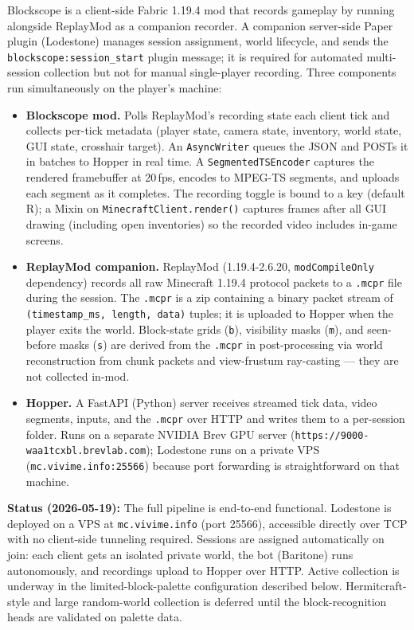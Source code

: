 \documentclass[11pt,a4paper]{article}
\begin{document}
Blockscope is a client-side Fabric 1.19.4 mod that records gameplay by running alongside ReplayMod as a companion recorder. A companion server-side Paper plugin (Lodestone) manages session assignment, world lifecycle, and sends the \texttt{blockscope:session\_start} plugin message; it is required for automated multi-session collection but not for manual single-player recording. Three components run simultaneously on the player's machine:

\begin{itemize}
  \item \textbf{Blockscope mod.} Polls ReplayMod's recording state each client tick and collects per-tick metadata (player state, camera state, inventory, world state, GUI state, crosshair target). An \texttt{AsyncWriter} queues the JSON and POSTs it in batches to Hopper in real time. A \texttt{SegmentedTSEncoder} captures the rendered framebuffer at 20\,fps, encodes to MPEG-TS segments, and uploads each segment as it completes. The recording toggle is bound to a key (default R); a Mixin on \texttt{MinecraftClient.render()} captures frames after all GUI drawing (including open inventories) so the recorded video includes in-game screens.

  \item \textbf{ReplayMod companion.} ReplayMod (1.19.4-2.6.20, \texttt{modCompileOnly} dependency) records all raw Minecraft 1.19.4 protocol packets to a \texttt{.mcpr} file during the session. The \texttt{.mcpr} is a zip containing a binary packet stream of \texttt{(timestamp\_ms, length, data)} tuples; it is uploaded to Hopper when the player exits the world. Block-state grids (\texttt{b}), visibility masks (\texttt{m}), and seen-before masks (\texttt{s}) are derived from the \texttt{.mcpr} in post-processing via world reconstruction from chunk packets and view-frustum ray-casting --- they are not collected in-mod.

  \item \textbf{Hopper.} A FastAPI (Python) server receives streamed tick data, video segments, inputs, and the \texttt{.mcpr} over HTTP and writes them to a per-session folder. Runs on a separate NVIDIA Brev GPU server (\texttt{https://9000-waa1tcxbl.brevlab.com}); Lodestone runs on a private VPS (\texttt{mc.vivime.info:25566}) because port forwarding is straightforward on that machine.
\end{itemize}

\textbf{Status (2026-05-19):} The full pipeline is end-to-end functional. Lodestone is deployed on a VPS at \texttt{mc.vivime.info} (port 25566), accessible directly over TCP with no client-side tunneling required. Sessions are assigned automatically on join: each client gets an isolated private world, the bot (Baritone) runs autonomously, and recordings upload to Hopper over HTTP. Active collection is underway in the limited-block-palette configuration described below. Hermitcraft-style and large random-world collection is deferred until the block-recognition heads are validated on palette data.
\end{document}
